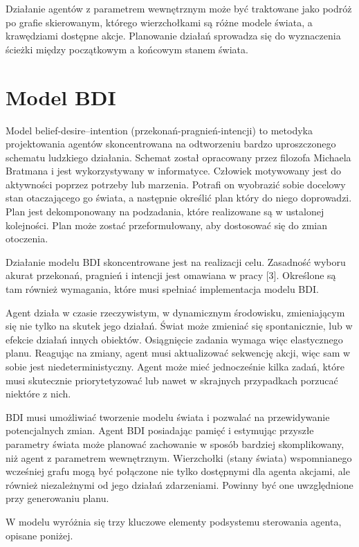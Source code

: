 Działanie agentów z parametrem wewnętrznym może być traktowane jako podróż po grafie skierowanym, którego wierzchołkami są różne modele świata, a krawędziami dostępne akcje. Planowanie działań sprowadza się do wyznaczenia ścieżki między początkowym a końcowym stanem świata.

\section{Model BDI}
Model belief-desire–intention (przekonań-pragnień-intencji) to metodyka projektowania agentów skoncentrowana na odtworzeniu bardzo uproszczonego schematu ludzkiego działania. Schemat został opracowany przez filozofa Michaela Bratmana i jest wykorzystywany w informatyce. Człowiek motywowany jest do aktywności poprzez potrzeby lub marzenia. Potrafi on wyobrazić sobie docelowy stan otaczającego go świata, a następnie określić plan który do niego doprowadzi. Plan jest dekomponowany na podzadania, które realizowane są w ustalonej kolejności. Plan może zostać przeformułowany, aby dostosować się do zmian otoczenia.

Działanie modelu BDI skoncentrowane jest na realizacji celu. Zasadność wyboru akurat przekonań, pragnień i intencji jest omawiana w pracy [3]. Określone są tam również wymagania, które musi spełniać implementacja modelu BDI.

Agent działa w czasie rzeczywistym, w dynamicznym środowisku, zmieniającym się nie tylko na skutek jego działań. Świat może zmieniać się spontanicznie, lub w efekcie działań innych obiektów. Osiągnięcie zadania wymaga więc elastycznego planu. Reagując na zmiany, agent musi aktualizować sekwencję akcji, więc sam w sobie jest niedeterministyczny. Agent może mieć jednocześnie kilka zadań, które musi skutecznie priorytetyzować lub nawet w skrajnych przypadkach porzucać niektóre z nich. %

BDI musi umożliwiać tworzenie modelu świata i pozwalać na przewidywanie potencjalnych zmian. Agent BDI posiadając pamięć i estymując przyszłe parametry świata może planować zachowanie w sposób bardziej skomplikowany, niż agent z parametrem wewnętrznym. Wierzchołki (stany świata) wspomnianego wcześniej grafu mogą być połączone nie tylko dostępnymi dla agenta akcjami, ale również niezależnymi od jego działań zdarzeniami. Powinny być one uwzględnione przy generowaniu planu.

W modelu wyróżnia się trzy kluczowe elementy podsystemu sterowania agenta, opisane poniżej. 

